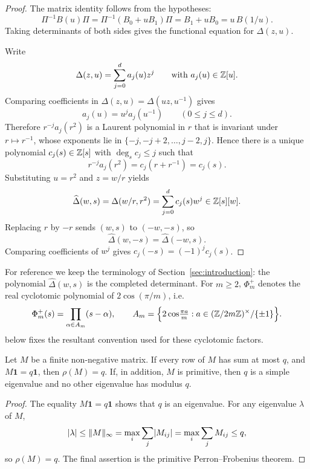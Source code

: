\begin{proof}
The matrix identity follows from the hypotheses:
\[
  \Pi^{-1}B(u)\Pi
  =\Pi^{-1}(B_0+uB_1)\Pi
  =B_1+uB_0
  =u\,B(1/u).
\]
Taking determinants of both sides gives the functional equation for
\(\Delta(z,u)\).

Write
\[
  \Delta(z,u)=\sum_{j=0}^d a_j(u)z^j
  \qquad\text{with }a_j(u)\in\mathbb{Z}[u].
\]
Comparing coefficients in
\(\Delta(z,u)=\Delta(uz,u^{-1})\) gives
\[
  a_j(u)=u^j a_j(u^{-1})
  \qquad (0\le j\le d).
\]
Therefore \(r^{-j}a_j(r^2)\) is a Laurent polynomial in \(r\) that is
invariant under \(r\mapsto r^{-1}\), whose exponents lie in
\(\{-j,-j+2,\dots,j-2,j\}\). Hence there is a unique polynomial
\(c_j(s)\in\mathbb{Z}[s]\) with \(\deg_s c_j\le j\) such that
\[
  r^{-j}a_j(r^2)=c_j(r+r^{-1})=c_j(s).
\]
Substituting \(u=r^2\) and \(z=w/r\) yields
\[
  \widehat\Delta(w,s)=\Delta(w/r,r^2)=\sum_{j=0}^d c_j(s)w^j\in\mathbb{Z}[s][w].
\]
Replacing \(r\) by \(-r\) sends \((w,s)\) to \((-w,-s)\), so
\[
  \widehat\Delta(w,-s)=\widehat\Delta(-w,s).
\]
Comparing coefficients of \(w^j\) gives
\(c_j(-s)=(-1)^j c_j(s)\).
\end{proof}
For reference we keep the terminology of Section~\ref{sec:introduction}:
the polynomial \(\widehat\Delta(w,s)\) is the completed determinant. For
\(m\ge2\), \(\Phi_m^+\) denotes the real cyclotomic polynomial of
\(2\cos(\pi/m)\), i.e.
\[
  \Phi_m^+(s)
  =
  \prod_{\alpha\in A_m}(s-\alpha),
  \qquad
  A_m=\Bigl\{2\cos\!\tfrac{\pi a}{m}:
      a\in(\mathbb{Z}/2m\mathbb{Z})^\times/\{\pm1\}\Bigr\}.
\]
 below fixes the resultant
convention used for these cyclotomic factors.

\begin{lemma}
  \label{lem:row-sum-perron-bound}
  Let \(M\) be a finite non-negative matrix. If every row of \(M\) has
  sum at most \(q\), and \(M\mathbf1=q\mathbf1\), then \(\rho(M)=q\).
  If, in addition, \(M\) is primitive, then \(q\) is a simple eigenvalue
  and no other eigenvalue has modulus \(q\).
\end{lemma}

\begin{proof}
The equality \(M\mathbf1=q\mathbf1\) shows that \(q\) is an eigenvalue.
For any eigenvalue \(\lambda\) of \(M\),
\[
  \lvert \lambda \rvert\le \|M\|_\infty
  =\max_i\sum_j \lvert M_{ij} \rvert
  =\max_i\sum_j M_{ij}\le q,
\]
so \(\rho(M)=q\). The final assertion is the primitive
Perron--Frobenius theorem.
\end{proof}


